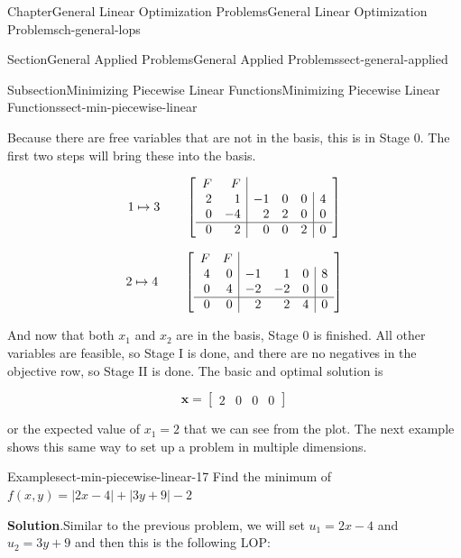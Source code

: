\documentclass[oneside,10pt,]{book}
\newcommand{\blocktitlefont}{\relax}
\numberwithin{equation}{section}
\newcommand{\amp}{&}
\begin{document}
\begin{chapterptx}{Chapter}{General Linear Optimization Problems}{}{General Linear Optimization Problems}{}{}{ch-general-lops}
\begin{sectionptx}{Section}{General Applied Problems}{}{General Applied Problems}{}{}{sect-general-applied}
\begin{subsectionptx}{Subsection}{Minimizing Piecewise Linear Functions}{}{Minimizing Piecewise Linear Functions}{}{}{sect-min-piecewise-linear}
\begin{equation*}
\end{equation*}
%
\par
Because there are free variables that are not in the basis, this is in Stage 0. The first two steps will bring these into the basis.%
\par
%
\begin{equation*}
1 \mapsto 3 \qquad \left[\begin{array}{rr|rrr|r} {\small F} \amp {\small F} \\ 2 \amp 1 \amp -1 \amp 0 \amp 0 \amp 4\\ 0 \amp -4 \amp 2 \amp 2 \amp 0 \amp 0\\ \hline 0 \amp 2 \amp 0 \amp 0 \amp 2 \amp 0\\ \end{array} \right]
\end{equation*}
%
\par
%
\begin{equation*}
2 \mapsto 4 \qquad \left[\begin{array}{rr|rrr|r} {\small F} \amp {\small F} \\ 4 \amp 0 \amp -1 \amp 1 \amp 0 \amp 8\\ 0 \amp 4 \amp -2 \amp -2 \amp 0 \amp 0\\ \hline 0 \amp 0 \amp 2 \amp 2 \amp 4 \amp 0\\ \end{array} \right]
\end{equation*}
%
\par
And now that both \(x_1\) and \(x_2\) are in the basis, Stage 0 is finished. All other variables are feasible, so Stage I is done, and there are no negatives in the objective row, so Stage II is done. The basic and optimal solution is%
\par
%
\begin{equation*}
\boldsymbol{x} = \left[\begin{array}{rr|rr} 2 \amp 0 \amp 0 \amp 0 \end{array}\right]
\end{equation*}
%
\par
or the expected value of \(x_1=2\) that we can see from the plot. The next example shows this same way to set up a problem in multiple dimensions.%
\begin{example}{Example}{}{sect-min-piecewise-linear-17}%
Find the minimum of \(f(x,y) = |2x-4|+|3y+9|-2\)%
\par\smallskip%
\noindent\textbf{\blocktitlefont Solution}.\hypertarget{sect-min-piecewise-linear-17-2}{}\quad{}Similar to the previous problem, we will set \(u_{1} = 2x-4\) and \(u_{2} = 3y+9\) and then this is the following LOP:%

\end{example}
\end{subsectionptx}
\end{sectionptx}
\end{chapterptx}
\end{document}
